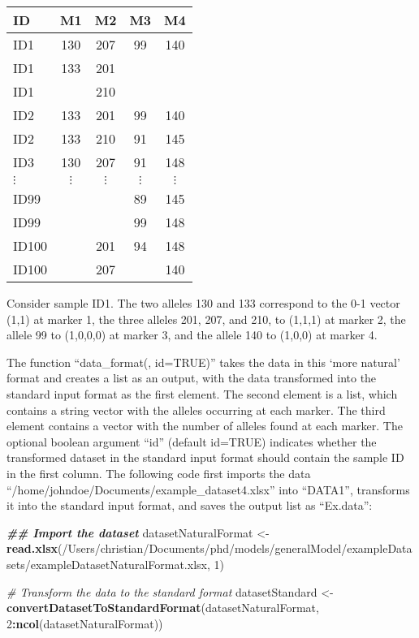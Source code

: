 \documentclass[
]{article}
\newenvironment{Shaded}{\begin{snugshade}}{\end{snugshade}}
\newcommand{\CommentTok}[1]{\textcolor[rgb]{0.56,0.35,0.01}{\textit{#1}}}
\newcommand{\DecValTok}[1]{\textcolor[rgb]{0.00,0.00,0.81}{#1}}
\newcommand{\DocumentationTok}[1]{\textcolor[rgb]{0.56,0.35,0.01}{\textbf{\textit{#1}}}}
\newcommand{\FunctionTok}[1]{\textcolor[rgb]{0.13,0.29,0.53}{\textbf{#1}}}
\newcommand{\NormalTok}[1]{#1}
\newcommand{\OtherTok}[1]{\textcolor[rgb]{0.56,0.35,0.01}{#1}}
\newcommand{\SpecialCharTok}[1]{\textcolor[rgb]{0.81,0.36,0.00}{\textbf{#1}}}
\newcommand{\StringTok}[1]{\textcolor[rgb]{0.31,0.60,0.02}{#1}}
\begin{document}
\begin{table}[tbh]
\centering
\begin{tabular}[5cm]{|l|c|c|c|c|}
\hline
ID      & M1   & M2   & M3  & M4  \\
\hline
ID1     & 130  & 207  & 99  & 140 \\
\hline
ID1     & 133  & 201  &     &     \\
\hline
ID1     &      & 210  &     &     \\
\hline
ID2     & 133  & 201  & 99  & 140 \\
\hline
ID2     & 133  & 210  & 91  & 145 \\
\hline
ID3     & 130  & 207  & 91  & 148 \\
\hline
$\vdots$ &  $\vdots$ & $\vdots$ & $\vdots$ & $\vdots$\\
\hline
ID99    &      &      & 89  & 145 \\
\hline
ID99    &      &      & 99  & 148 \\
\hline
ID100   &      & 201  & 94  & 148\\
\hline
ID100   &      & 207  &     & 140\\
\hline
\end{tabular}
\label{table2man}
\end{table}

Consider sample ID1. The two alleles 130 and 133 correspond to the 0-1
vector (1,1) at marker 1, the three alleles 201, 207, and 210, to
(1,1,1) at marker 2, the allele 99 to (1,0,0,0) at marker 3, and the
allele 140 to (1,0,0) at marker 4.

The function ``data\_format(, id=TRUE)'' takes the data in this `more
natural' format and creates a list as an output, with the data
transformed into the standard input format as the first element. The
second element is a list, which contains a string vector with the
alleles occurring at each marker. The third element contains a vector
with the number of alleles found at each marker. The optional boolean
argument ``id'' (default id=TRUE) indicates whether the transformed
dataset in the standard input format should contain the sample ID in the
first column. The following code first imports the data
``/home/johndoe/Documents/example\_dataset4.xlsx'' into ``DATA1'',
transforms it into the standard input format, and saves the output list
as ``Ex.data'':

\begin{Shaded}
\begin{Highlighting}[]
\DocumentationTok{\#\# Import the dataset}
\NormalTok{datasetNaturalFormat }\OtherTok{\textless{}{-}} \FunctionTok{read.xlsx}\NormalTok{(}\StringTok{\textquotesingle{}/Users/christian/Documents/phd/models/generalModel/exampleDatasets/exampleDatasetNaturalFormat.xlsx\textquotesingle{}}\NormalTok{, }\DecValTok{1}\NormalTok{)}

\CommentTok{\# Transform the data to the standard format}
\NormalTok{datasetStandard }\OtherTok{\textless{}{-}} \FunctionTok{convertDatasetToStandardFormat}\NormalTok{(datasetNaturalFormat, }\DecValTok{2}\SpecialCharTok{:}\FunctionTok{ncol}\NormalTok{(datasetNaturalFormat))}
\end{Highlighting}
\end{Shaded}
\end{document}
